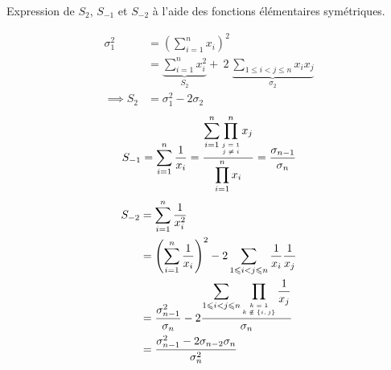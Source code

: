 \documentclass{article}
\begin{document}
\begin{question_kholle}
	[Les sommes de Newton $(S_k)_{k\in\Z^*}$ pour une famille $(x_k)_{k \in \N^*}$ sont définies par (sous réserve d'existence pour $k<0$) :
	\begin{equation}
		S_k = \sum_{i=1}^{n} x_i^k
	\end{equation}]
	{Expression de $S_2$, $S_{-1}$ et $S_{-2}$ à l'aide des fonctions élémentaires symétriques.}
	
	\begin{equation*}
		\begin{aligned}
			\sigma_1^2 &= \left( \sum_{i=1}^{n} x_i \right)^2 \\
			&= \underbrace{ \sum_{i=1}^{n} x_i^2 }_{S_2} + \ 2 \ \underbrace{ \sum_{1 \leqslant i < j \leqslant n} x_i x_j }_{\sigma_2} \\
			\implies S_2 &= \sigma_1^2 - 2 \sigma_2
		\end{aligned}
	\end{equation*}
	\begin{equation*}
		S_{-1} = \sum_{i=1}^{n} \frac{1}{x_i}
		= \frac{\displaystyle \sum_{i=1}^{n} \prod_{\tiny \begin{matrix} j = 1 \\ j \neq i \end{matrix}}^{n} x_j }{\displaystyle \prod_{i=1}^{n} x_i }
		= \frac{\sigma_{n-1}}{\sigma_n}
	\end{equation*}
	\begin{equation*}
		\begin{aligned}
			S_{-2} &= \sum_{i=1}^{n} \frac{1}{x_i^2} \\
			&= \left( \sum_{i=1}^{n} \frac{1}{x_i} \right)^2 - 2 \sum_{1 \leqslant i < j \leqslant n} \frac{1}{x_i} \frac{1}{x_j} \\
			&= \frac{\sigma_{n-1}^2}{\sigma_n} - 2 \frac{\displaystyle \sum_{1 \leqslant i < j \leqslant n} \prod_{\tiny \begin{matrix} k = 1 \\ k \notin \{i,j\} \end{matrix}} \frac{1}{x_j} }{\sigma_n} \\
			&= \frac{\sigma_{n-1}^2 - 2 \sigma_{n-2}\sigma_n}{\sigma_n^2}
		\end{aligned}
	\end{equation*}
\end{question_kholle}
\end{document}
